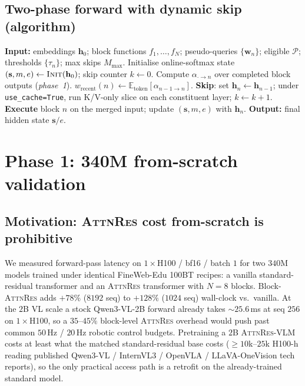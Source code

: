 \documentclass{article}
\newcommand{\attnres}{\textsc{AttnRes}}
\newcommand{\reskip}{\textsc{ReSkip}}
\newcommand{\E}{\mathbb{E}}
\begin{document}
\subsection{Two-phase forward with dynamic skip (algorithm)}
\label{app:algorithm}
\begin{algorithm}[h]
\caption{Two-phase \attnres{} forward with dynamic \reskip{}.}
\label{alg:two_phase}
\begin{algorithmic}[1]
\STATE \textbf{Input:} embeddings $\mathbf{h}_0$; block functions $f_1,\dots,f_N$; pseudo-queries $\{\mathbf{w}_n\}$; eligible $\mathcal{P}$; thresholds $\{\tau_n\}$; max skips $M_{\max}$.
\STATE Initialise online-softmax state $(\mathbf{s}, m, e) \gets \textsc{Init}(\mathbf{h}_0)$; skip counter $k \gets 0$.
  \STATE Compute $\alpha_{\cdot \to n}$ over completed block outputs (\emph{phase~1}).
  \STATE $w_{\text{recent}}(n) \gets \E_{\text{token}}[\alpha_{n-1\to n}]$.
    \STATE \textbf{Skip}: set $\mathbf{h}_n \gets \mathbf{h}_{n-1}$; under \texttt{use\_cache=True}, run K/V-only slice on each constituent layer; $k \gets k+1$.
  \ELSE
    \STATE \textbf{Execute} block $n$ on the merged input; update $(\mathbf{s},m,e)$ with $\mathbf{h}_n$.
  \ENDIF
\ENDFOR
\STATE \textbf{Output:} final hidden state $\mathbf{s}/e$.
\end{algorithmic}
\end{algorithm}

\section{Phase 1: 340M from-scratch validation}
\label{app:phase1_section}

\subsection{Motivation: \attnres{} cost from-scratch is prohibitive}
\label{app:motivation}
We measured forward-pass latency on $1{\times}$H100 / bf16 / batch $1$ for two $340$M models trained under identical FineWeb-Edu 100BT recipes: a vanilla standard-residual transformer and an \attnres{} transformer with $N{=}8$ blocks. Block-\attnres{} adds $+78\%$ ($8192$ seq) to $+128\%$ ($1024$ seq) wall-clock vs.\ vanilla. At the $2$B VL scale a stock Qwen3-VL-2B forward already takes $\sim$$25.6$\,ms at seq $256$ on $1{\times}$H100, so a $35$--$45\%$ block-level \attnres{} overhead would push past common $50$\,Hz / $20$\,Hz robotic control budgets. Pretraining a $2$B \attnres{}-VLM costs at least what the matched standard-residual base costs ($\geq 10$k--$25$k H100-h reading published Qwen3-VL / InternVL3 / OpenVLA / LLaVA-OneVision tech reports), so the only practical access path is a retrofit on the already-trained standard model.
\end{document}

